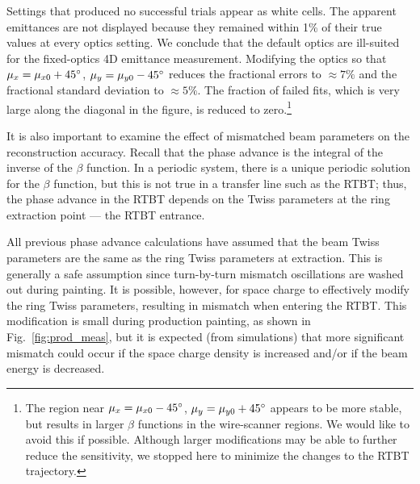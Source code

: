 %
Settings that produced no successful trials appear as white cells. The apparent emittances are not displayed because they remained within 1\% of their true values at every optics setting. We conclude that the default optics are ill-suited for the fixed-optics 4D emittance measurement. Modifying the optics so that $\mu_x = \mu_{x0} + 45\degree$, $\mu_y = \mu_{y0} - 45\degree$ reduces the fractional errors to $\approx 7\%$ and the fractional standard deviation to $\approx 5\%$. The fraction of failed fits, which is very large along the diagonal in the figure, is reduced to zero.\footnote{The region near $\mu_x = \mu_{x0} - 45\degree$, $\mu_y = \mu_{y0} + 45\degree$ appears to be more stable, but results in larger $\beta$ functions in the wire-scanner regions. We would like to avoid this if possible. Although larger modifications may be able to further reduce the sensitivity, we stopped here to minimize the changes to the RTBT trajectory.}

It is also important to examine the effect of mismatched beam parameters on the reconstruction accuracy. Recall that the phase advance is the integral of the inverse of the $\beta$ function. In a periodic system, there is a unique periodic solution for the $\beta$ function, but this is not true in a transfer line such as the RTBT; thus, the phase advance in the RTBT depends on the Twiss parameters at the ring extraction point — the RTBT entrance. 

All previous phase advance calculations have assumed that the beam Twiss parameters are the same as the ring Twiss parameters at extraction. This is generally a safe assumption since turn-by-turn mismatch oscillations are washed out during painting. It is possible, however, for space charge to effectively modify the ring Twiss parameters, resulting in mismatch when entering the RTBT. This modification is small during production painting, as shown in Fig.~\ref{fig:prod_meas}, but it is expected (from simulations) that more significant mismatch could occur if the space charge density is increased and/or if the beam energy is decreased.

